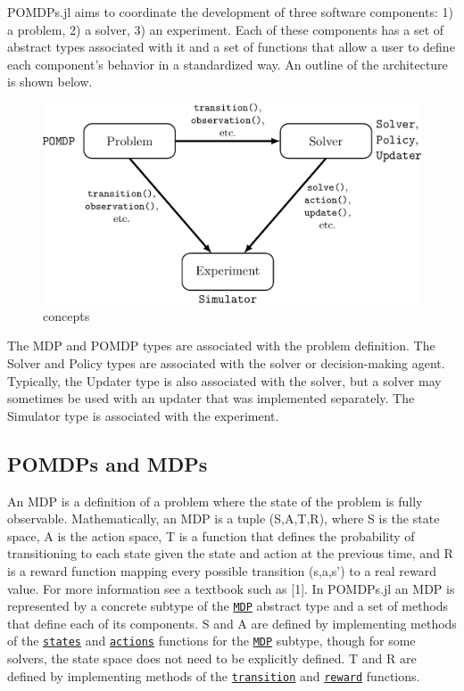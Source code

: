 \documentclass[12pt,]{article}
\begin{document}
POMDPs.jl aims to coordinate the development of three software
components: 1) a problem, 2) a solver, 3) an experiment. Each of these
components has a set of abstract types associated with it and a set of
functions that allow a user to define each component's behavior in a
standardized way. An outline of the architecture is shown below.

\begin{figure}[htbp]
\centering
\includegraphics{figures/concepts.png}
\caption{concepts}
\end{figure}

The MDP and POMDP types are associated with the problem definition. The
Solver and Policy types are associated with the solver or
decision-making agent. Typically, the Updater type is also associated
with the solver, but a solver may sometimes be used with an updater that
was implemented separately. The Simulator type is associated with the
experiment.

\subsection{POMDPs and MDPs}\label{pomdps-and-mdps}

An MDP is a definition of a problem where the state of the problem is
fully observable. Mathematically, an MDP is a tuple (S,A,T,R), where S
is the state space, A is the action space, T is a function that defines
the probability of transitioning to each state given the state and
action at the previous time, and R is a reward function mapping every
possible transition (s,a,s') to a real reward value. For more
information see a textbook such as {[}1{]}. In POMDPs.jl an MDP is
represented by a concrete subtype of the
\href{api.md\#POMDPs.MDP}{\texttt{MDP}} abstract type and a set of
methods that define each of its components. S and A are defined by
implementing methods of the
\href{api.md\#POMDPs.states}{\texttt{states}} and
\href{api.md\#POMDPs.actions}{\texttt{actions}} functions for the
\href{api.md\#POMDPs.MDP}{\texttt{MDP}} subtype, though for some
solvers, the state space does not need to be explicitly defined. T and R
are defined by implementing methods of the
\href{api.md\#POMDPs.transition}{\texttt{transition}} and
\href{api.md\#POMDPs.reward}{\texttt{reward}} functions.
\end{document}
